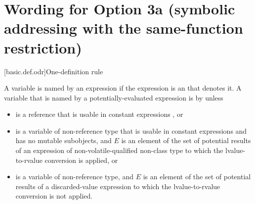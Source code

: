 \documentclass{wg21}
\begin{document}
\section{Wording for Option 3a (symbolic addressing with the same-function restriction)}

[basic.def.odr]{One-definition rule}%


\label{term.odr.use}%
A variable is named by an expression
if the expression is an  that denotes it.
A variable  that is named by a
potentially-evaluated expression 
is  by  unless
\begin{removedblock}
\begin{itemize}
    \item
     is a reference that is
    usable in constant expressions , or
    \item
     is a variable of non-reference type that is
    usable in constant expressions and has no mutable subobjects, and
    $E$ is an element of the set of potential results of an expression
    of non-volatile-qualified non-class type
    to which the lvalue-to-rvalue conversion  is applied, or
    \item
     is a variable of non-reference type, and
    $E$ is an element of the set of potential results
    of a discarded-value expression 
    to which the lvalue-to-rvalue conversion is not applied.
\end{itemize}
\end{removedblock}

\end{document}
